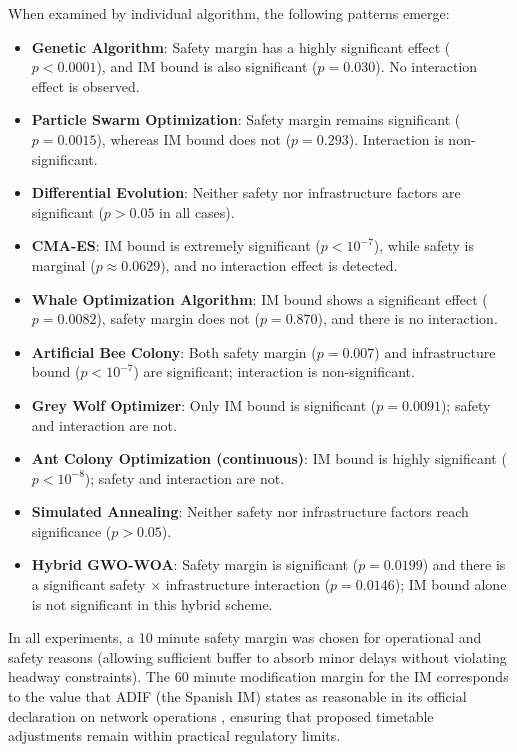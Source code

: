 \documentclass[Afour,sagev,times]{sagej}
\begin{document}
When examined by individual algorithm, the following patterns emerge:
\begin{itemize}
    \item \textbf{Genetic Algorithm}: Safety margin has a highly significant effect (\(p<0.0001\)), and \gls{IM} bound is also significant (\(p=0.030\)). No interaction effect is observed.
    \item \textbf{Particle Swarm Optimization}: Safety margin remains significant (\(p=0.0015\)), whereas \gls{IM} bound does not (\(p=0.293\)). Interaction is non-significant.
    \item \textbf{Differential Evolution}: Neither safety nor infrastructure factors are significant (\(p>0.05\) in all cases).
    \item \textbf{CMA-ES}: \gls{IM} bound is extremely significant (\(p<10^{-7}\)), while safety is marginal (\(p\approx0.0629\)), and no interaction effect is detected.
    \item \textbf{Whale Optimization Algorithm}: \gls{IM} bound shows a significant effect (\(p=0.0082\)), safety margin does not (\(p=0.870\)), and there is no interaction.
    \item \textbf{Artificial Bee Colony}: Both safety margin (\(p=0.007\)) and infrastructure bound (\(p<10^{-7}\)) are significant; interaction is non-significant.
    \item \textbf{Grey Wolf Optimizer}: Only \gls{IM} bound is significant (\(p=0.0091\)); safety and interaction are not.
    \item \textbf{Ant Colony Optimization (continuous)}: \gls{IM} bound is highly significant (\(p<10^{-8}\)); safety and interaction are not.
    \item \textbf{Simulated Annealing}: Neither safety nor infrastructure factors reach significance (\(p>0.05\)).
    \item \textbf{Hybrid GWO-WOA}: Safety margin is significant (\(p=0.0199\)) and there is a significant safety × infrastructure interaction (\(p=0.0146\)); \gls{IM} bound alone is not significant in this hybrid scheme.
\end{itemize}

In all experiments, a 10 minute safety margin was chosen for operational and safety reasons (allowing sufficient buffer to absorb minor delays without violating headway constraints). The 60 minute modification margin for the \gls{IM} corresponds to the value that ADIF (the Spanish \gls{IM}) states as reasonable in its official declaration on network operations \cite{Adif24}, ensuring that proposed timetable adjustments remain within practical regulatory limits.
\end{document}
